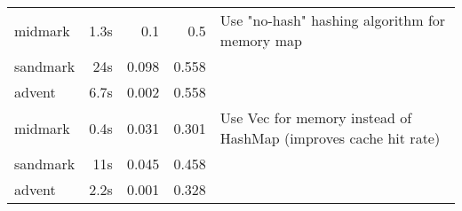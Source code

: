 \documentclass{article}
\begin{document}
\begin{tabulary}{\textwidth}{lrrrL}
    \hline
    midmark   & 1.3s & 0.1          & 0.5         & Use "no-hash" hashing algorithm for memory map                  \\
    sandmark  & 24s  & 0.098        & 0.558       &                                                                 \\
    advent    & 6.7s & 0.002        & 0.558       &                                                                 \\
    \hline
    midmark   & 0.4s & 0.031        & 0.301       & Use Vec for memory instead of HashMap (improves cache hit rate) \\
    sandmark  & 11s  & 0.045        & 0.458       &                                                                 \\
    advent    & 2.2s & 0.001        & 0.328       &                                                                 \\
    \hline
\end{tabulary}
\end{document}
